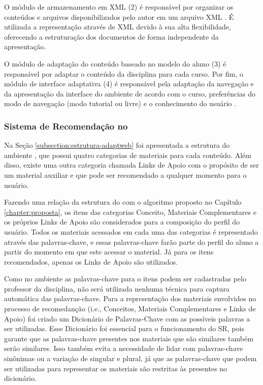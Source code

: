 O módulo de armazenamento em XML (2) é responsável por organizar os conteúdos e arquivos disponibilizados pelo autor em
um arquivo XML \cite{gasparini2003interface}. É utilizada a representação através de XML devido à sua alta
flexibilidade, oferecendo a estruturação dos documentos de forma independente da apresentação.

O módulo de adaptação do conteúdo baseado no modelo do aluno (3) é responsável por adaptar o conteúdo da disciplina
para cada curso. Por fim, o módulo de interface adaptativa (4) é responsável pela adaptação da navegação e da
apresentação da interface do ambiente de acordo com o curso, preferências do modo de navegação (modo tutorial ou livre)
e o conhecimento do usuário \cite{gasparini2003interface}.

\subsubsection{Sistema de Recomendação no \adaptweb}

Na Seção \ref{subsection:estrutura-adaptweb} foi apresentada a estrutura do ambiente \adaptweb, que possui quatro categorias
de materiais para cada conteúdo. Além disso, existe uma outra categoria chamada Links de Apoio com o propósito de ser um
material auxiliar e que pode ser recomendado a qualquer momento para o usuário.

Fazendo uma relação da estrutura do \adaptwebspace com o algoritmo proposto no Capítulo \ref{chapter:proposta}, os itens
das categorias Conceito, Materiais Complementares e os próprios Links de Apoio são considerados para a composição do
perfil do usuário. Todos os materiais acessados em cada uma das categorias é representado através das palavras-chave, e
essas palavras-chave farão parte do perfil do aluno a partir do momento em que este acessar o material. Já para os itens
recomendados, apenas os Links de Apoio são utilizados.

Como no ambiente \adaptwebspace as palavras-chave para o itens podem ser cadastradas pelo professor da disciplina, não será
utilizada nenhuma técnica para captura automática das palavras-chave. Para a representação dos materiais envolvidos no
processo de recomedanção (i.e., Conceitos, Materiais Complementares e Links de Apoio) foi criado um Dicionário de Palavras-Chave
com as possíveis palavras a ser utilizadas. Esse Dicionário foi essencial para o funcionamento do SR, pois garante que as
palavras-chave presentes nos materiais que são similares também serão similares. Isso também evita a necessidade de lidar
com palavras-chave sinônimas ou a variação de singular e plural, já que as palavras-chave que podem ser utilizadas para
representar os materiais são restritas às presentes no dicionário.

